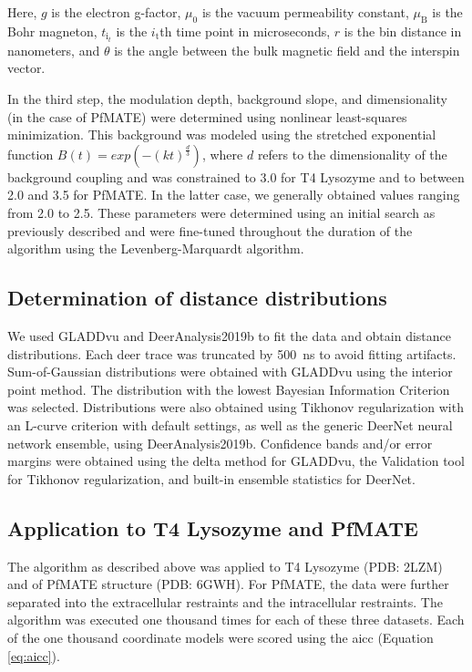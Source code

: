 Here, $g$ is the electron g-factor, $\mu_{\mathup{0}}$ is the vacuum permeability constant, $\mu_{\mathup{B}}$ is the Bohr magneton, $t_{\mathup{i}_{t}}$ is the $i_{\mathup{t}}$th time point in microseconds, $r$ is the bin distance in nanometers, and $\theta$ is the angle between the bulk magnetic field and the interspin vector.

In the third step, the modulation depth, background slope, and dimensionality (in the case of PfMATE) were determined using nonlinear least-squares minimization. This background was modeled using the stretched exponential function $B \left( t \right) = exp \left( - \left( kt \right)^\frac{d}{3} \right)$, where $d$ refers to the dimensionality of the background coupling and was constrained to 3.0 for T4 Lysozyme and to between 2.0 and 3.5 for PfMATE. In the latter case, we generally obtained values ranging from 2.0 to 2.5. These parameters were determined using an initial search as previously described and were fine-tuned throughout the duration of the algorithm using the Levenberg-Marquardt algorithm.

\subsection{Determination of distance distributions}

We used GLADDvu \citep*{Hustedt2018} and DeerAnalysis2019b \citep*{Jeschke2006} to fit the data and obtain distance distributions. Each \gls{deer} trace was truncated by \SI{500}{ns} to avoid fitting artifacts. Sum-of-Gaussian distributions were obtained with GLADDvu using the interior point method. The distribution with the lowest Bayesian Information Criterion was selected. Distributions were also obtained using Tikhonov regularization with an L-curve criterion with default settings, as well as the generic DeerNet neural network ensemble, using DeerAnalysis2019b. Confidence bands and/or error margins were obtained using the delta method for GLADDvu, the Validation tool for Tikhonov regularization, and built-in ensemble statistics for DeerNet.

\subsection{Application to T4 Lysozyme and PfMATE}

The algorithm as described above was applied to T4 Lysozyme (PDB: 2LZM) and \gls{of} PfMATE structure (PDB: 6GWH). For PfMATE, the data were further separated into the extracellular restraints and the intracellular restraints. The algorithm was executed one thousand times for each of these three datasets. Each of the one thousand coordinate models were scored using the \gls{aicc} (Equation \ref{eq:aicc}).

